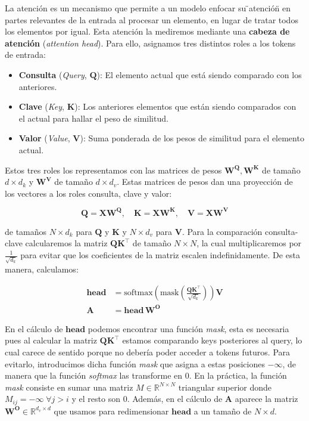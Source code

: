 \documentclass[12pt,twoside]{article}
\begin{document}
La atención es un mecanismo que permite a un modelo enfocar su \"{}atención\"{} en partes relevantes de la entrada al procesar un elemento, en lugar de tratar todos los elementos por igual. Esta atención la mediremos mediante una \textbf{cabeza de atención} (\textit{attention head}). Para ello, asignamos tres distintos roles a los tokens de entrada:
\begin{itemize}
    \item \textbf{Consulta} (\textit{Query}, $\mathbf{Q}$): El elemento actual que está siendo comparado con los anteriores.
    \item \textbf{Clave} (\textit{Key}, $\mathbf{K}$): Los anteriores elementos que están siendo comparados con el actual para hallar el peso de similitud.
    \item \textbf{Valor} (\textit{Value}, $\mathbf{V}$): Suma ponderada de los pesos de similitud para el elemento actual.
\end{itemize}
Estos tres roles los representamos con las matrices de pesos $\mathbf{W^{Q}}, \mathbf{W^{K}}$ de tamaño $d\times d_k$ y $\mathbf{W^{V}}$ de tamaño $d\times d_v$. Estas matrices de pesos dan una proyección de los vectores a los roles consulta, clave y valor:

\begin{equation}
    \mathbf{Q}=\mathbf{XW^Q},\quad \mathbf{K}=\mathbf{XW^K}, \quad \mathbf{V}=\mathbf{XW^V}
\end{equation}

de tamaños $N\times d_k$ para $\mathbf{Q}$ y $\mathbf{K}$ y $N\times d_v$ para $\mathbf{V}$. Para la comparación consulta-clave calcularemos la matriz $\mathbf{QK}^\top$ de tamaño $N\times N$, la cual multiplicaremos por $\frac{1}{\sqrt{d_k}}$ para evitar que los coeficientes de la matriz escalen indefinidamente. De esta manera, calculamos:

\begin{align}
\textbf{head} &= \text{softmax} \left( \text{mask} \left( \frac{\mathbf{QK}^\top}{\sqrt{d_k}} \right) \right) \mathbf{V} \\
\mathbf{A} &= \textbf{head} \, \mathbf{W^O}
\end{align}

En el cálculo de $\mathbf{head}$ podemos encontrar una función \textit{mask}, esta es necesaria pues al calcular la matriz $\mathbf{QK}^\top$ estamos comparando keys posteriores al query, lo cual carece de sentido porque no debería poder acceder a tokens futuros. Para evitarlo, introducimos dicha función \textit{mask} que asigna a estas posiciones $-\infty$, de manera que la función \textit{softmax} las transforme en $0$. En la práctica, la función \textit{mask} consiste en sumar una matriz $M\in\mathbb{R}^{N\times N}$ triangular superior donde $M_{ij}=-\infty\;\forall j>i$ y el resto son $0$. Además, en el cálculo de $\mathbf{A}$ aparece la matriz $\mathbf{W^O}\in\mathbb{R}^{d_v\times d}$ que usamos para redimensionar $\mathbf{head}$ a un tamaño de $N\times d$.
\end{document}
